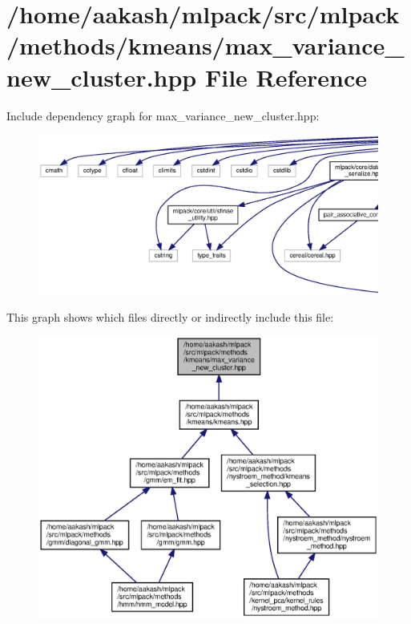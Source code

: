 \section{/home/aakash/mlpack/src/mlpack/methods/kmeans/max\+\_\+variance\+\_\+new\+\_\+cluster.hpp File Reference}
\label{max__variance__new__cluster_8hpp}
Include dependency graph for max\+\_\+variance\+\_\+new\+\_\+cluster.\+hpp\+:
\nopagebreak
\begin{figure}[H]
\begin{center}
\leavevmode
\includegraphics[width=350pt]{max__variance__new__cluster_8hpp__incl}
\end{center}
\end{figure}
This graph shows which files directly or indirectly include this file\+:
\nopagebreak
\begin{figure}[H]
\begin{center}
\leavevmode
\includegraphics[width=350pt]{max__variance__new__cluster_8hpp__dep__incl}
\end{center}
\end{figure}
